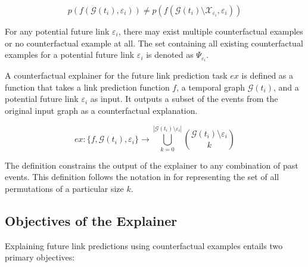 \begin{equation}
    \label{e_CFExplanation}
    p(f(\mathcal{G}(t_i), \varepsilon_{i})) \neq p(f(\mathcal{G}(t_i) \setminus \mathcal{X}_{\varepsilon_i}, \varepsilon_{i}))
\end{equation}

For any potential future link $\varepsilon_{i}$, there may exist multiple counterfactual examples or no counterfactual example at all. The set containing all existing counterfactual examples for a potential future link $\varepsilon_{i}$ is denoted as $\Psi_{\varepsilon_i}$.

A counterfactual explainer for the future link prediction task $ex$ is defined as a function that takes a link prediction function $f$, a temporal graph $\mathcal{G}(t_i)$, and a potential future link $\varepsilon_i$ as input. It outputs a subset of the events from the original input graph as a counterfactual explanation.

\begin{equation}
    \label{e_Explainer}
    ex: \{f, \mathcal{G}(t_i), \varepsilon_i\} \rightarrow \bigcup_{k = 0}^{|\mathcal{G}(t_i) \setminus \varepsilon_i|} {\mathcal{G}(t_i) \setminus \varepsilon_i \choose k}
\end{equation}

The definition constrains the output of the explainer to any combination of past events. This definition follows the notation in \cite{stanley_enumerative_1986} for representing the set of all permutations of a particular size $k$.

\subsection{Objectives of the Explainer}
\label{s_ProblemFormulation_Objectives}

Explaining future link predictions using counterfactual examples entails two primary objectives:

